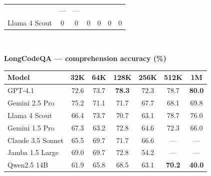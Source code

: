 {\begin{figure}[H]
\begin{minipage}{\linewidth}
\begin{tabular}{l|cccccc}
  & \cellcolor{SoftGray}---
  & \cellcolor{SoftGray}---\\
Llama 4 Scout
  & \cellcolor{AccentRed!50}0
  & \cellcolor{AccentRed!50}0
  & \cellcolor{AccentRed!50}0
  & \cellcolor{AccentRed!50}0
  & \cellcolor{AccentRed!50}0
  & \cellcolor{AccentRed!50}0\\
\bottomrule
\end{tabular}
\end{minipage}
\\[10pt]
\begin{minipage}{\linewidth}
\centering
\textbf{LongCodeQA --- comprehension accuracy (\%)}\\[3pt]
\begin{tabular}{l|cccccc}
\toprule
\textbf{Model} & 32K & 64K & 128K & 256K & 512K & 1M\\
\midrule
GPT-4.1
  & \cellcolor{AccentGreen!42}72.6
  & \cellcolor{AccentGreen!45}73.7
  & \cellcolor{AccentGreen!55}\textbf{78.3}
  & \cellcolor{AccentGreen!42}72.3
  & \cellcolor{AccentGreen!55}78.7
  & \cellcolor{AccentGreen!60}\textbf{80.0}\\
Gemini 2.5 Pro
  & \cellcolor{AccentGreen!50}75.2
  & \cellcolor{AccentGreen!40}71.1
  & \cellcolor{AccentGreen!40}71.7
  & \cellcolor{AccentGreen!35}67.7
  & \cellcolor{AccentGreen!36}68.1
  & \cellcolor{AccentGreen!38}69.8\\
Llama 4 Scout
  & \cellcolor{AccentGreen!32}66.4
  & \cellcolor{AccentGreen!45}73.7
  & \cellcolor{AccentGreen!40}70.7
  & \cellcolor{AccentGreen!28}63.1
  & \cellcolor{AccentGreen!55}78.7
  & \cellcolor{AccentGreen!50}76.0\\
Gemini 1.5 Pro
  & \cellcolor{AccentGreen!35}67.3
  & \cellcolor{AccentGreen!28}63.2
  & \cellcolor{AccentGreen!45}72.8
  & \cellcolor{AccentGreen!30}64.6
  & \cellcolor{AccentGreen!45}72.3
  & \cellcolor{AccentGreen!35}66.0\\
Claude 3.5 Sonnet
  & \cellcolor{AccentGreen!30}65.5
  & \cellcolor{AccentGreen!38}69.7
  & \cellcolor{AccentGreen!42}71.7
  & \cellcolor{AccentGreen!32}66.6
  & \cellcolor{SoftGray}---
  & \cellcolor{SoftGray}---\\
Jamba 1.5 Large
  & \cellcolor{AccentGreen!38}69.0
  & \cellcolor{AccentGreen!38}69.7
  & \cellcolor{AccentGreen!42}72.8
  & \cellcolor{AccentRed!12}54.2
  & \cellcolor{SoftGray}---
  & \cellcolor{SoftGray}---\\
Qwen2.5 14B
  & \cellcolor{AccentGreen!22}61.9
  & \cellcolor{AccentGreen!30}65.8
  & \cellcolor{AccentGreen!35}68.5
  & \cellcolor{AccentGreen!28}63.1
  & \cellcolor{AccentGreen!38}\textbf{70.2}
  & \cellcolor{AccentRed!22}\textbf{40.0}\\
\bottomrule
\end{tabular}
\end{minipage}


\end{figure}}
